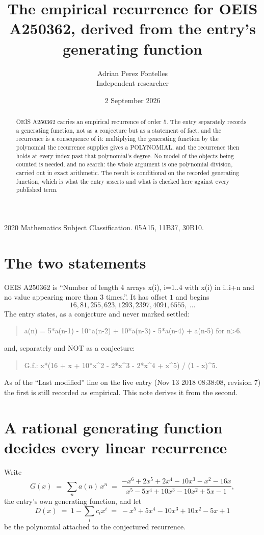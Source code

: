 \documentclass[11pt,a4paper]{article}
\title{The empirical recurrence for OEIS A250362, derived from the entry's generating function}
\author{Adrian Perez Fontelles\\ \small Independent researcher}
\date{2 September 2026}
\theoremstyle{plain}
\theoremstyle{definition}
\begin{document}
\maketitle

\begin{abstract}
OEIS A250362 carries an empirical recurrence of order $5$. The entry separately records a
generating function, not as a conjecture but as a statement of fact, and the recurrence is a
consequence of it: multiplying the generating function by the polynomial the recurrence
supplies gives a POLYNOMIAL, and the recurrence then holds at every index past that
polynomial's degree. No model of the objects being counted is needed, and no search: the
whole argument is one polynomial division, carried out in exact arithmetic. The result is
conditional on the recorded generating function, which is what the entry asserts and what is
checked here against every published term.
\end{abstract}

\noindent\small 2020 Mathematics Subject Classification. 05A15, 11B37, 30B10.\normalsize

\section{The two statements}

OEIS A250362 is ``Number of length 4 arrays x(i), i=1..4 with x(i) in i..i+n and no value appearing more than 3 times.''. It has offset $1$ and begins
\[
16, 81, 255, 623, 1293, 2397, 4091, 6555,\ \dots
\]
The entry states, as a conjecture and never marked settled:
\begin{quote}
a(n) = 5*a(n-1) - 10*a(n-2) + 10*a(n-3) - 5*a(n-4) + a(n-5) for n>6.
\end{quote}
and, separately and NOT as a conjecture:
\begin{quote}
G.f.: x*(16 + x + 10*x\^{}2 - 2*x\^{}3 - 2*x\^{}4 + x\^{}5) / (1 - x)\^{}5.
\end{quote}
As of the ``Last modified'' line on the live entry (Nov 13 2018 08:38:08, revision 7) the first is still
recorded as empirical. This note derives it from the second.

\section{A rational generating function decides every linear recurrence}

Write
\[
G(x)\;=\;\sum_{n}a(n)\,x^{n}\;=\;\frac{- x^{6} + 2 x^{5} + 2 x^{4} - 10 x^{3} - x^{2} - 16 x}{x^{5} - 5 x^{4} + 10 x^{3} - 10 x^{2} + 5 x - 1},
\]
the entry's own generating function, and let
\[
D(x)\;=\;1-\sum_i c_i x^{i}\;=\;- x^{5} + 5 x^{4} - 10 x^{3} + 10 x^{2} - 5 x + 1
\]
be the polynomial attached to the conjectured recurrence.
\end{document}
